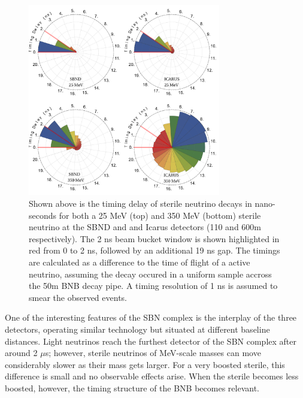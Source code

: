 \documentclass[11pt, a4paper]{article}
\begin{document}
\begin{figure}[t]
%
\center
%
\includegraphics[width=0.75\textwidth]{figures/timing.pdf}
%
\caption{\label{fig:timing} Shown above is the timing delay of sterile neutrino
decays in nano-seconds for both a 25 MeV (top) and 350 MeV (bottom) sterile
neutrino at the SBND and and Icarus detectors (110 and 600m
respectively). The 2 ns beam bucket window is shown highlighted in red from 0
to 2 ns, followed by an additional 19 ns gap. The timings are calculated as a
difference to the time of flight of a active neutrino, assuming the decay
occured in a uniform sample accross the 50m BNB decay pipe. A timing resolution
of 1 ns is assumed to smear the observed events.}
%
\end{figure}

One of the interesting features of the SBN complex is the interplay of the
three detectors, operating similar technology but situated at different
baseline distances.
%
Light neutrinos reach the furthest detector of the SBN complex after around 2
$\mu$s; however, sterile neutrinos of MeV-scale masses can move considerably
slower as their mass gets larger. For a very boosted sterile, this difference
is small and no observable effects arise. When the sterile becomes less
boosted, however, the timing structure of the BNB becomes relevant.
\end{document}
